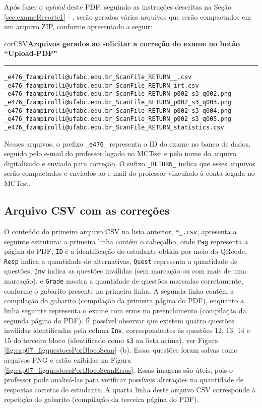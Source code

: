 Após fazer o \textit{upload} deste PDF, seguindo as instruções descritas na Seção \ref{sec:exameRecorte1} - , serão gerados vários arquivos que serão compactados em um arquivo ZIP, conforme apresentado a seguir:

\begin{myboxCode}{corCSV}{\textbf{Arquivos gerados ao solicitar a correção do exame no botão ``Upload-PDF''}}\vspace{3mm}
\hrule
\begin{verbatim}
_e476_fzampirolli@ufabc.edu.br_ScanFile_RETURN__.csv
_e476_fzampirolli@ufabc.edu.br_ScanFile_RETURN_irt.csv
_e476_fzampirolli@ufabc.edu.br_ScanFile_RETURN_p002_s3_q002.png
_e476_fzampirolli@ufabc.edu.br_ScanFile_RETURN_p002_s3_q003.png
_e476_fzampirolli@ufabc.edu.br_ScanFile_RETURN_p002_s3_q004.png
_e476_fzampirolli@ufabc.edu.br_ScanFile_RETURN_p002_s3_q005.png
_e476_fzampirolli@ufabc.edu.br_ScanFile_RETURN_statistics.csv
\end{verbatim}
\end{myboxCode}

Nesses arquivos, o prefixo \verb|_e476_| representa o ID do exame no banco de dados, seguido pelo e-mail do professor logado no MCTest e pelo nome do arquivo digitalizado e enviado para correção. O sufixo \verb|_RETURN_| indica que esses arquivos serão compactados e enviados ao e-mail do professor vinculado à conta logada no MCTest. 

\subsection{Arquivo CSV com as correções}\label{sec:CSVcorrecoesQR}

O conteúdo do primeiro arquivo CSV na lista anterior, \verb|*_.csv|, apresenta a seguinte estrutura: a primeira linha contém o cabeçalho, onde \verb|Pag| representa a página do PDF, \verb|ID| é a identificação do estudante obtida por meio do QRcode, \verb|Resp| indica a quantidade de alternativas, \verb|Quest| representa a quantidade de questões, \verb|Inv| indica as questões inválidas (sem marcação ou com mais de uma marcação), e \verb|Grade| mostra a quantidade de questões marcadas corretamente, conforme o gabarito presente na primeira linha. A segunda linha contém a compilação do gabarito (compilação da primeira página do PDF), enquanto a linha seguinte representa o exame com erros no preenchimento (compilação da segunda página do PDF). É possível observar que existem quatro questões inválidas identificadas pela coluna \verb|Inv|, correspondentes às questões 12, 13, 14 e 15 do terceiro bloco (identificado como \verb|s3| na lista acima), ver Figura \ref{fig:cap07_figquestoesPorBlocoScan}--(b). Essas questões foram salvas como arquivos PNG e estão exibidas na Figura \ref{fig:cap07_figquestoesPorBlocoScanErros}.  Essas imagens são úteis, pois o professor pode analisá-las para verificar possíveis alterações na quantidade de respostas corretas do estudante. A quarta linha deste arquivo CSV corresponde à repetição do gabarito (compilação da terceira página do PDF).

